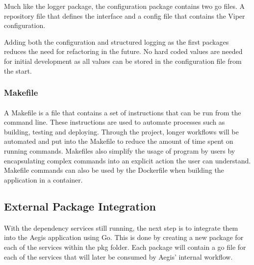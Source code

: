 \documentclass[12pt, conference, final, a4paper, onecolumn, compsoc]{IEEEtran}
\begin{document}
Much like the logger package, the configuration package contains two go files. A
repository file that defines the interface and a config file that contains the
Viper configuration.



Adding both the configuration and structured logging as the first packages
reduces the need for refactoring in the future. No hard coded values are needed
for initial development as all values can be stored in the configuration file
from the start.

\subsubsection*{Makefile}
\paragraph{}

A Makefile is a file that contains a set of instructions that can be run from
the command line. These instructions are used to automate processes such as
building, testing and deploying. Through the project, longer workflows will be
automated and put into the Makefile to reduce the amount of time spent on
running commands. Makefiles also simplify the usage of program by users by
encapsulating complex commands into an explicit action the user can understand.
Makefile commands can also be used by the Dockerfile when building the
application in a container.




\subsection*{External Package Integration}
\paragraph{}

With the dependency services still running, the next step is to integrate them
into the Aegis application using Go. This is done by creating a new package for
each of the services within the pkg folder. Each package will contain a go file
for each of the services that will later be consumed by Aegis' internal
workflow.
\end{document}
